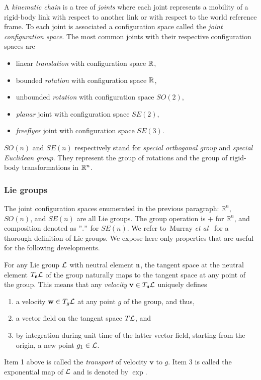 A \textit{kinematic chain} is a tree of \textit{joints} where each
joint represents a mobility of a rigid-body link with respect to
another link or with respect to the world reference frame. To each joint is
associated a configuration space called the \textit{joint configuration space}.
The most common joints with their respective configuration spaces are
\begin{itemize}
\item linear \textit{translation} with configuration space $\mathbb{R}$,
\item bounded \textit{rotation} with configuration space  $\mathbb{R}$,
\item unbounded \textit{rotation} with configuration space  $SO(2)$,
\item \textit{planar} joint with configuration space $SE(2)$,
\item \textit{freeflyer} joint with configuration space $SE(3)$.
\end{itemize}
$SO(n)$ and $SE(n)$ respectively stand for \textit{special orthogonal group} and \textit{special Euclidean group}. They represent the group of rotations and the group of rigid-body transformations in $\mathbb{R}^n$.

\subsubsection{Lie groups}

The joint configuration spaces enumerated in the previous paragraph: $\mathbb{R}^n$, $SO(n)$, and $SE(n)$ are all Lie groups. The group operation is $+$ for $\mathbb{R}^n$, and composition denoted as $"."$ for $SE(n)$. We refer to~{\color{blue}Murray \textit{et al}}~\cite[Appendix A]{LMS94} for a thorough definition of Lie groups. We expose here only properties that are useful for the following developments.

For any Lie group $\mathcal{L}$ with neutral element $\mathfrak{n}$, the tangent space at the neutral element $T_{\mathfrak{n}}\mathcal{L}$ of the group naturally maps to the tangent space at any point of the group. This means that any \textit{velocity} $\mathbf{v}\in T_{\mathfrak{n}}\mathcal{L}$ uniquely defines
\begin{enumerate}
\item a velocity $\mathbf{w}\in T_{g}\mathcal{L}$ at any point $g$ of the group, and thus,
\item a vector field on the tangent space $T\mathcal{L}$, and
\item by integration during unit time of the latter vector field, starting from the origin, a new point $g_{1}\in\mathcal{L}$.
\end{enumerate}
Item 1 above is called the \textit{transport} of velocity $\mathbf{v}$ to $g$.
Item 3 is called the exponential map of $\mathcal{L}$ and is denoted by $\exp$.

